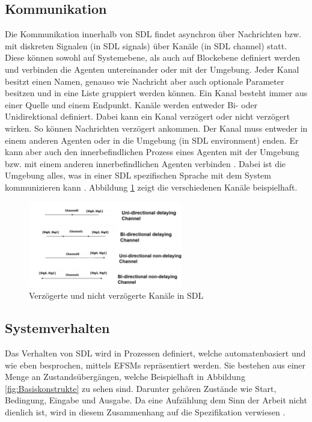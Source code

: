 \subsection{Kommunikation}
\label{ssc:Kommunikation}
Die Kommunikation innerhalb von \ac{SDL} findet asynchron über Nachrichten bzw. mit diskreten Signalen (in \ac{SDL} signals) über Kanäle (in \ac{SDL} channel) statt. 
Diese können sowohl auf Systemebene, als auch auf Blockebene definiert werden und verbinden die Agenten untereinander oder mit der Umgebung.
Jeder Kanal besitzt einen Namen, genauso wie Nachricht aber auch optionale Parameter besitzen und in eine Liste gruppiert werden können.
Ein Kanal besteht immer aus einer Quelle und einem Endpunkt. Kanäle werden entweder Bi- oder Unidirektional definiert. Dabei kann ein Kanal verzögert oder nicht verzögert wirken. So können Nachrichten verzögert ankommen. Der Kanal muss entweder in einem anderen Agenten oder in die Umgebung (in \ac{SDL} environment) enden. Er kann aber auch den innerbefindlichen Prozess eines Agenten mit der Umgebung bzw. mit einem anderen innerbefindlichen Agenten verbinden \cite[39-42]{ITUT101_2016}. Dabei ist die Umgebung alles, was in einer \ac{SDL} spezifischen Sprache mit dem System kommunizieren kann \cite[3\psq]{ITUT100_2016}.
Abbildung \ref{fig:KommModell} zeigt die verschiedenen Kanäle beispielhaft.
 
\begin{figure}[h]
	\centering
	\includegraphics[width=0.6\textwidth]{Graphics/Channel.png}
	\caption{Verzögerte und nicht verzögerte Kanäle in SDL}
	\label{fig:KommModell}
\end{figure}

\subsection{Systemverhalten}
\label{ssc:Verhalten}
Das Verhalten von \ac{SDL} wird in Prozessen definiert, welche automatenbasiert und wie eben besprochen, mittels \ac{EFSM}s repräsentiert werden. Sie bestehen aus einer Menge an Zustandsübergängen, welche Beispielhaft in Abbildung \ref{fig:Basiskonstrukte} zu sehen sind. Darunter gehören Zustände wie Start, Bedingung, Eingabe und Ausgabe. Da eine Aufzählung dem Sinn der Arbeit nicht dienlich ist, wird in diesem Zusammenhang auf die Spezifikation verwiesen \cite[44 \psqq]{ITUT101_2016}.


